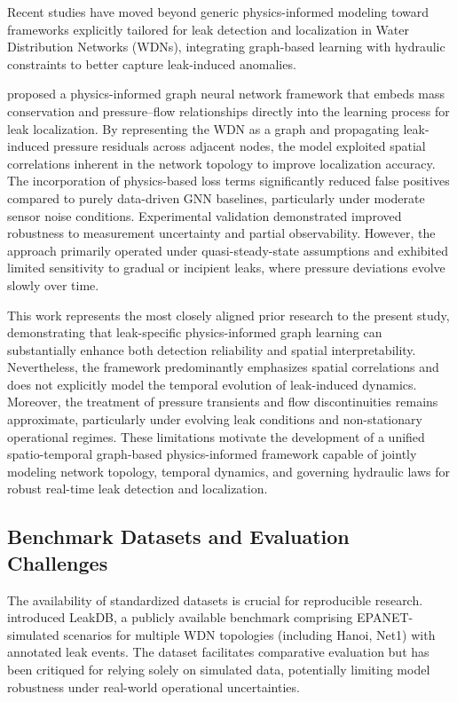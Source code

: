 \documentclass[final,5p,times,twocolumn,authoryear]{elsarticle}
\begin{document}
Recent studies have moved beyond generic physics-informed modeling toward frameworks explicitly tailored for leak detection and localization in Water Distribution Networks (WDNs), integrating graph-based learning with hydraulic constraints to better capture leak-induced anomalies.

\cite{ORNGARDARSSON2022661} proposed a physics-informed graph neural network framework that embeds mass conservation and pressure–flow relationships directly into the learning process for leak localization. By representing the WDN as a graph and propagating leak-induced pressure residuals across adjacent nodes, the model exploited spatial correlations inherent in the network topology to improve localization accuracy. The incorporation of physics-based loss terms significantly reduced false positives compared to purely data-driven GNN baselines, particularly under moderate sensor noise conditions. Experimental validation demonstrated improved robustness to measurement uncertainty and partial observability. However, the approach primarily operated under quasi-steady-state assumptions and exhibited limited sensitivity to gradual or incipient leaks, where pressure deviations evolve slowly over time.

This work represents the most closely aligned prior research to the present study, demonstrating that leak-specific physics-informed graph learning can substantially enhance both detection reliability and spatial interpretability. Nevertheless, the framework predominantly emphasizes spatial correlations and does not explicitly model the temporal evolution of leak-induced dynamics. Moreover, the treatment of pressure transients and flow discontinuities remains approximate, particularly under evolving leak conditions and non-stationary operational regimes. These limitations motivate the development of a unified spatio-temporal graph-based physics-informed framework capable of jointly modeling network topology, temporal dynamics, and governing hydraulic laws for robust real-time leak detection and localization.

\subsection{Benchmark Datasets and Evaluation Challenges}

The availability of standardized datasets is crucial for reproducible research. \cite{kyriakou2018leakdb} introduced LeakDB, a publicly available benchmark comprising EPANET-simulated scenarios for multiple WDN topologies (including Hanoi, Net1) with annotated leak events. The dataset facilitates comparative evaluation but has been critiqued for relying solely on simulated data, potentially limiting model robustness under real-world operational uncertainties.
\end{document}
